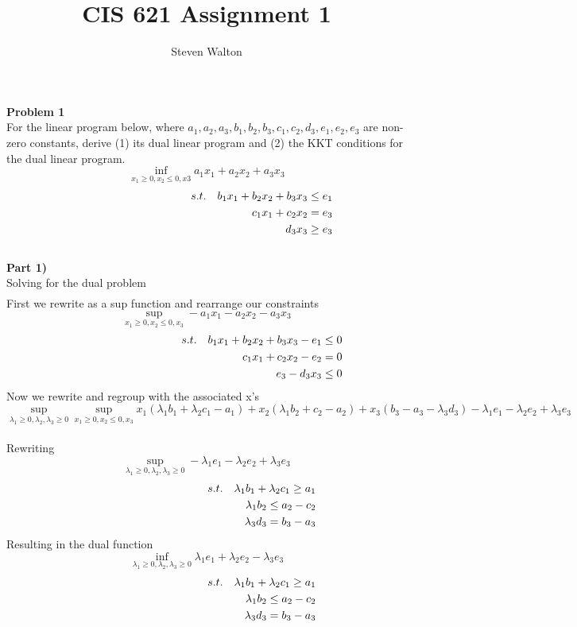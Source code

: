 \documentclass[12pt,letter]{article}
\newcommand{\problem}[1]{\vspace{3mm}\Large\textbf{{Problem {#1}\vspace{3mm}}}\normalsize\\}
\newcommand{\ppart}[1]{\vspace{2mm}\large\textbf{\\Part {#1})\vspace{2mm}}\normalsize\\}
\begin{document}
\title{CIS 621 Assignment 1}
\author{Steven Walton}
\maketitle
\problem{1}
For the linear program below, where $a_1,a_2,a_3,b_1,b_2,b_3,c_1,c_2,d_3,e_1,
e_2,e_3$ are non-zero constants, derive (1) its dual linear program and (2)
the KKT conditions for the dual linear program.
\[
    \inf\limits_{x_1\geq 0, x_2\leq0,x3} a_1x_1 + a_2x_2 + a_3x_3 
\]
\vspace{-0.7cm}
\begin{align*}
    \hspace{3.5cm}s.t. && b_1x_1 + b_2x_2 + b_3x_3 \leq e_1 \\
         && c_1x_1 + c_2x_2 = e_3 \\
         && d_3x_3 \geq e_3
\end{align*}
\ppart{1}
Solving for the dual problem
\begin{align*}
\end{align*}
First we rewrite as a sup function and rearrange our constraints
\[
    \sup\limits_{x_1\geq0, x_2\leq0,x_3} -a_1x_1 - a_2x_2 - a_3x_3
\]
\vspace{-0.7cm}
\begin{align*}
    \hspace{3.5cm}s.t. && b_1x_1 + b_2x_2 + b_3x_3 - e_1 \leq 0 \\
                       && c_1x_1 + c_2x_2 -e_2 = 0 \\
                       && e_3 - d_3x_3 \leq 0
\end{align*}
Now we rewrite and regroup with the associated x's
\[
    \sup\limits_{\lambda_1\geq0,\lambda_2,\lambda_3\geq0}\sup\limits_{x_1\geq0,x_2\leq0,x_3}
    x_1(\lambda_1b_1+\lambda_2c_1-a_1)
    + x_2(\lambda_1b_2 + c_2 -a_2)
    + x_3(b_3 - a_3 -\lambda_3d_3)
    - \lambda_1e_1 - \lambda_2e_2 + \lambda_3e_3
\]
\pagebreak
\\Rewriting
\[
    \sup\limits_{\lambda_1\geq0,\lambda_2,\lambda_3\geq0} -\lambda_1e_1 -\lambda_2e_2 + \lambda_3e_3
\]
\vspace{-0.7cm}
\begin{align*}
    \hspace{3.5cm}s.t. && \lambda_1b_1 + \lambda_2c_1 \geq a_1 \\
                       && \lambda_1b_2 \leq a_2 - c_2 \\
                       && \lambda_3d_3 = b_3 - a_3
\end{align*}
Resulting in the dual function
\[
    \inf\limits_{\lambda_1\geq0,\lambda_2,\lambda_3\geq0} \lambda_1e_1 +\lambda_2e_2 - \lambda_3e_3
\]
\vspace{-0.7cm}
\begin{align*}
    \hspace{3.5cm}s.t. && \lambda_1b_1 + \lambda_2c_1 \geq a_1 \\
                       && \lambda_1b_2 \leq a_2 - c_2 \\
                       && \lambda_3d_3 = b_3 - a_3
\end{align*}
\end{document}
